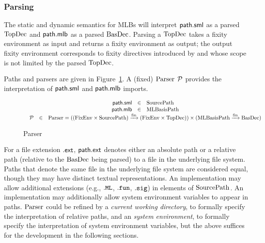 \subsubsection{Parsing}
The static and dynamic semantics for MLBs will interpret
$\mathsf{path.sml}$ as a parsed $\mathrm{TopDec}$ and
$\mathsf{path.mlb}$ as a parsed $\mathrm{BasDec}$.  Parsing a $\mathrm{TopDec}$
takes a fixity environment as input and returns a fixity environment
as output; the output fixity environment corresponds to fixity
directives introduced by and whose scope is not limited by the parsed
$\mathrm{TopDec}$.

Paths and parsers are given in Figure~\ref{fig:mlb:S:PathsParser}.  A
(fixed) $\mathrm{Parser}$ $\mathcal{P}$ provides the interpretation of
$\mathsf{path.sml}$ and $\mathsf{path.mlb}$ imports.
\begin{figure}[h]
\begin{displaymath}
\begin{array}{c}
\begin{array}{rcl}
\mathsf{path.sml} & \in & \mathrm{SourcePath} \\
\mathsf{path.mlb} & \in & \mathrm{MLBasisPath} 
\end{array} \\
\begin{array}{rcl}
\mathcal{P} & \in & \mathrm{Parser} = 
((\mathrm{FixEnv} \times \mathrm{SourcePath})
 \xrightarrow{\mathrm{fin}} (\mathrm{FixEnv} \times \mathrm{TopDec})) 
\times 
(\mathrm{MLBasisPath} \xrightarrow{\mathrm{fin}} \mathrm{BasDec}) 
\end{array}
\end{array}
\end{displaymath}
\caption{Parser}\label{fig:mlb:S:PathsParser}
\end{figure}
%
For a file extension $\mathsf{.ext}$, $\mathsf{path.ext}$ denotes either an
absolute path or a relative path (relative to the $\mathrm{BasDec}$ being
parsed) to a file in the underlying file system.  Paths that denote the same
file in the underlying file system are considered equal, though they may
have distinct textual representations.  An implementation
may allow additional extensions (e.g., $\mathtt{.ML}$, $\mathtt{.fun}$,
$\mathtt{.sig}$) in elements of $\mathrm{SourcePath}$.  An implementation
may additionally allow system environment variables to appear in
paths.  $\mathrm{Parser}$ could be refined by a \emph{current working
directory}, to formally specify the interpretation of relative paths,
and an \emph{system environment}, to formally specify the
interpretation of system environment variables, but the above suffices
for the development in the following sections.
%
